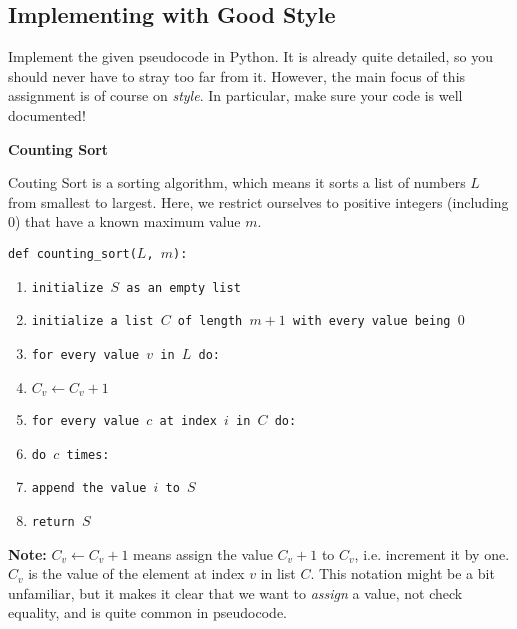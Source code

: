 \subsection{Implementing with Good Style}

Implement the given pseudocode in Python. It is already quite detailed, so you should never have to stray too far from it. However, the main focus of this assignment is of course on \textit{style}. In particular, make sure your code is well documented!

\vspace{1em}

\noindent \textbf{Counting Sort}

\vspace{1em}

\noindent Couting Sort is a sorting algorithm, which means it sorts a list of numbers $L$ from smallest to largest. Here, we restrict ourselves to positive integers (including $0$) that have a known maximum value $m$.

\vspace{1em}

\noindent \texttt{def counting\_sort($L$, $m$):}

\begin{enumerate}
    \item \texttt{initialize $S$ as an empty list}
    \item \texttt{initialize a list $C$ of length $m + 1$ with every value being $0$}
    \item \texttt{for every value $v$ in $L$ do:}
    \item \hspace{2em} \texttt{$C_v \leftarrow C_v + 1$}
    \item \texttt{for every value $c$ at index $i$ in $C$ do:}
    \item \hspace{2em} \texttt{do $c$ times:}
    \item \hspace{4em} \texttt{append the value $i$ to $S$}
    \item \texttt{return $S$}
\end{enumerate}

\noindent \textbf{Note:} $C_v \leftarrow C_v + 1$ means assign the value $C_v + 1$ to $C_v$, i.e. increment it by one. $C_v$ is the value of the element at index $v$ in list $C$. This notation might be a bit unfamiliar, but it makes it clear that we want to \textit{assign} a value, not check equality, and is quite common in pseudocode.

